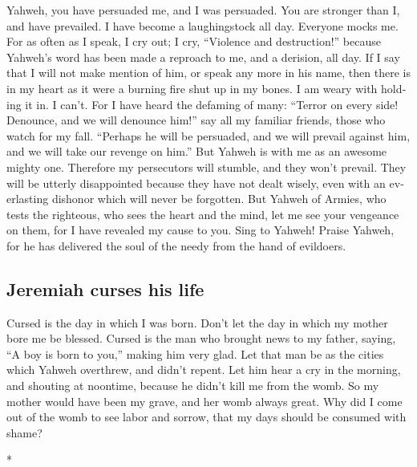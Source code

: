 \begin{paracol}{2}
\begin{otherlanguage}{english}
 Yahweh, you have persuaded me, and I was persuaded. You
are stronger than I, and have prevailed. I have become a laughingstock
all day. Everyone mocks me.  For as often as I speak, I
cry out; I cry, ``Violence and destruction!'' because Yahweh's word has
been made a reproach to me, and a derision, all day.  If I
say that I will not make mention of him, or speak any more in his name,
then there is in my heart as it were a burning fire shut up in my bones.
I am weary with holding it in. I can't.  For I have heard
the defaming of many: ``Terror on every side! Denounce, and we will
denounce him!'' say all my familiar friends, those who watch for my
fall. ``Perhaps he will be persuaded, and we will prevail against him,
and we will take our revenge on him.''  But Yahweh is
with me as an awesome mighty one. Therefore my persecutors will stumble,
and they won't prevail. They will be utterly disappointed because they
have not dealt wisely, even with an everlasting dishonor which will
never be forgotten.  But Yahweh of Armies, who tests the
righteous, who sees the heart and the mind, let me see your vengeance on
them, for I have revealed my cause to you.  Sing to
Yahweh! Praise Yahweh, for he has delivered the soul of the needy from
the hand of evildoers.

\hypertarget{jeremiah-curses-his-life}{%
\subsection{Jeremiah curses his life}\label{jeremiah-curses-his-life}}

 Cursed is the day in which I was born. Don't let the day
in which my mother bore me be blessed.  Cursed is the man
who brought news to my father, saying, ``A boy is born to you,'' making
him very glad.  Let that man be as the cities which
Yahweh overthrew, and didn't repent. Let him hear a cry in the morning,
and shouting at noontime,  because he didn't kill me from
the womb. So my mother would have been my grave, and her womb always
great.  Why did I come out of the womb to see labor and
sorrow, that my days should be consumed with shame?

\end{otherlanguage}

\switchcolumn[0]*

\hypertarget{unheilvolle-antwort-jeremias-an-zedekias-gesandte-und-mahnungen-an-das-volk-wuxe4hrend-der-belagerung-jerusalems}{%
}
\end{paracol}
